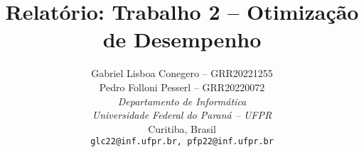\documentclass[a4paper, 11pt]{article}
\title{Relatório: Trabalho 2 -- Otimização de Desempenho}
\author{Gabriel Lisboa Conegero -- GRR20221255\\
        Pedro Folloni Pesserl -- GRR20220072\\
    \textit{Departamento de Informática}\\
    \textit{Universidade Federal do Paraná -- UFPR}\\
    Curitiba, Brasil\\
    \texttt{glc22@inf.ufpr.br, pfp22@inf.ufpr.br}}
\date{}
\begin{document}
\maketitle

\begin{abstract}
\begin{singlespace}

\end{singlespace}
\end{abstract}
\end{document}
